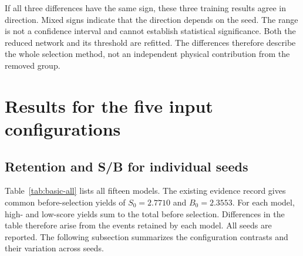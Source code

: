 \documentclass[11pt,a4paper]{article}
\begin{document}
If all three differences have the same sign, these three training results agree in direction. Mixed signs indicate that the direction depends on the seed.
The range is not a confidence interval and cannot establish statistical significance.
Both the reduced network and its threshold are refitted. The differences therefore describe the whole selection method, not an independent physical contribution from the removed group.
\FloatBarrier

\section{Results for the five input configurations}\label{sec:results}

\subsection{Retention and S/B for individual seeds}
Table~\ref{tab:basic-all} lists all fifteen models.
The existing evidence record gives common before-selection yields of $S_0=2.7710$ and $B_0=2.3553$. For each model, high- and low-score yields sum to the total before selection.
Differences in the table therefore arise from the events retained by each model.
All seeds are reported. The following subsection summarizes the configuration contrasts and their variation across seeds.
\end{document}
